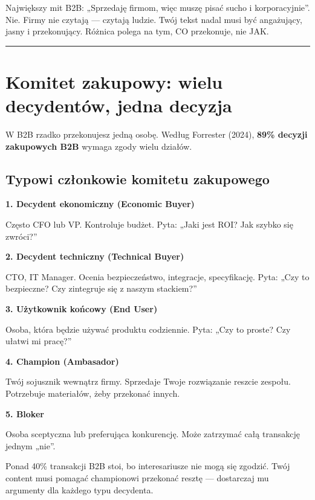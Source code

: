 \documentclass[
  12pt,
  a4paper,
  twoside,
  openright,
  12pt,
  DIV=12,
  BCOR=12mm]{scrbook}
\newcommand{\decoline}{%
  \begin{center}
    \textcolor{bordergray}{\rule{0.3\textwidth}{0.5pt}}
  \end{center}
}
\begin{document}
\begin{wazne}
Największy mit B2B: „Sprzedaję firmom, więc muszę pisać sucho i korporacyjnie”. Nie. Firmy nie czytają --- czytają ludzie. Twój tekst nadal musi być angażujący, jasny i przekonujący. Różnica polega na tym, CO przekonuje, nie JAK.
\end{wazne}

\decoline

\section{Komitet zakupowy: wielu decydentów, jedna
decyzja}\label{komitet-zakupowy-wielu-decydentuxf3w-jedna-decyzja}

W B2B rzadko przekonujesz jedną osobę. Według Forrester (2024),
\textbf{89\% decyzji zakupowych B2B} wymaga zgody wielu działów.

\subsection{Typowi członkowie komitetu
zakupowego}\label{typowi-czux142onkowie-komitetu-zakupowego}

\textbf{1. Decydent ekonomiczny (Economic Buyer)}

Często CFO lub VP. Kontroluje budżet. Pyta: „Jaki jest ROI? Jak szybko
się zwróci?''

\textbf{2. Decydent techniczny (Technical Buyer)}

CTO, IT Manager. Ocenia bezpieczeństwo, integracje, specyfikację. Pyta:
„Czy to bezpieczne? Czy zintegruje się z naszym stackiem?''

\textbf{3. Użytkownik końcowy (End User)}

Osoba, która będzie używać produktu codziennie. Pyta: „Czy to proste?
Czy ułatwi mi pracę?''

\textbf{4. Champion (Ambasador)}

Twój sojusznik wewnątrz firmy. Sprzedaje Twoje rozwiązanie reszcie
zespołu. Potrzebuje materiałów, żeby przekonać innych.

\textbf{5. Bloker}

Osoba sceptyczna lub preferująca konkurencję. Może zatrzymać całą
transakcję jednym „nie''.

\begin{wskazowka}
Ponad 40\% transakcji B2B stoi, bo interesariusze nie mogą się zgodzić. Twój content musi pomagać championowi przekonać resztę --- dostarczaj mu argumenty dla każdego typu decydenta.
\end{wskazowka}
\end{document}
